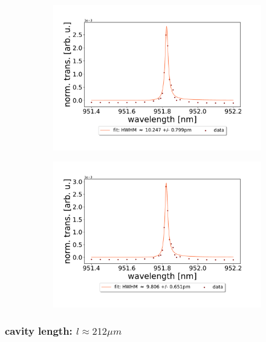 \begin{figure}[h!]
\begin{subfigure}[b]{0.49\textwidth}
        \includegraphics[width=\textwidth]{figures/results/single fano fits/380um_M5_fit_3.pdf}
        \caption{}
        \label{fig:380um_M5_fit_3}
    \end{subfigure}
    \begin{subfigure}[b]{0.49\textwidth}
        \includegraphics[width=\textwidth]{figures/results/single fano fits/380um_M5_fit_4.pdf}
        \caption{}
        \label{fig:380um_M5_fit_4}
    \end{subfigure}
\end{figure}

\clearpage
\subsubsection*{cavity length: $l \approx 212 \mu m$}

